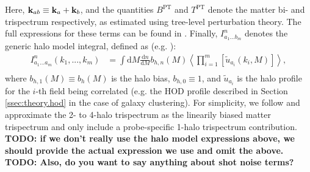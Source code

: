 \documentclass[a4paper,11pt]{article}
\newcommand{\todo}[1]{{\bf TODO: #1}}
\begin{document}
    Here, ${\bf k}_{ab}\equiv {\bf k}_a+{\bf k}_b$, and the quantities $B^{\mathrm{PT}}$ and $T^{\mathrm{PT}}$ denote the matter bi- and trispectrum respectively, as estimated using tree-level perturbation theory. The full expressions for these terms can be found in \cite{Takada:2013}. Finally, $I^{n}_{a_1...b_m}$ denotes the generic halo model integral, defined as (e.g. \cite{Krause:2017}):
    \begin{align}
      I^{n}_{a_1...a_m}(k_1,...,k_m) &= \int \mathrm{d}M \frac{\mathrm{d}n}{\mathrm{d}M}b_{h, n}(M)  \left\langle\prod_{i=1}^m \left[\tilde{u}_{a_i}(k_i, M) \right]\right\rangle, \\
    \end{align}
    where $b_{h,1}(M)\equiv b_h(M)$ is the halo bias, $b_{h,0}\equiv1$, and $\tilde{u}_{a_i}$ is the halo profile for the $i$-th field being correlated (e.g. the HOD profile described in Section \ref{ssec:theory.hod} in the case of galaxy clustering). For simplicity, we follow \cite{Krause:2017} and approximate the 2- to 4-halo trispectrum as the linearily biased matter trispectrum and only include a probe-specific 1-halo trispectrum contribution. \todo{if we don't really use the halo model expressions above, we should provide the actual expression we use and omit the above.} \todo{Also, do you want to say anything about shot noise terms?}
\end{document}
